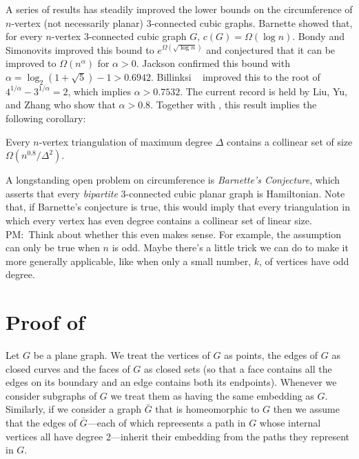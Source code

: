 \documentclass{patmorin}
\newcommand{\note}[2]{{\color{red}#1:~#2}}
\begin{document}
A series of results has steadily improved the lower bounds on the
circumference of $n$-vertex  (not necessarily planar) 3-connected cubic
graphs.  Barnette \cite{barnette:4} showed that, for every $n$-vertex
3-connected cubic graph $G$, $c(G)=\Omega(\log n)$.  Bondy and Simonovits
\cite{bondy.simonovits:7} improved this bound to $e^{\Omega(\sqrt{\log
n})}$ and conjectured that it can be improved to $\Omega(n^\alpha)$ for $\alpha>0$.
Jackson \cite{jackson:8} confirmed this bound with $\alpha=\log_2(1+\sqrt{5})-1
> 0.6942$.  Billinksi \etal\ \cite{billinksi.jacdson.ea:6} improved this
to the root of $4^{1/\alpha}-3^{1/\alpha}=2$, which implies $\alpha>0.7532$.  The current
record is held by Liu, Yu, and Zhang \cite{liu.yu.zhang:circumference}
who show that $\alpha>0.8$.  Together with , this result implies
the following corollary:

\begin{cor}
  Every $n$-vertex triangulation of maximum degree $\Delta$ contains a
  collinear set of size $\Omega(n^{0.8}/\Delta^2)$.
\end{cor}


A longstanding open problem on circumference is \emph{Barnette's
Conjecture}, which asserts that every \emph{bipartite} 3-connected cubic
planar graph is Hamiltonian. Note that, if Barnette's conjecture is true,
this would imply that every triangulation in which every vertex has even
degree contains a collinear set of linear size.  \note{PM}{Think about
whether this even makes sense. For example, the assumption can only be
true when $n$ is odd.  Maybe there's a little trick we can do to make
it more generally applicable, like when only a small number, $k$, of
vertices have odd degree.}



\section{Proof of }

Let $G$ be a plane graph.  We treat the vertices of $G$ as points,
the edges of $G$ as closed curves and the faces of $G$ as closed sets
(so that a face contains all the edges on its boundary and an edge
contains both its endpoints).  Whenever we consider subgraphs of $G$
we treat them as having the same embedding as $G$.  Similarly, if we
consider a graph $\bar{G}$ that is homeomorphic to $G$ then we assume
that the edges of $\bar{G}$---each of which repreesents a path in $G$
whose internal vertices all have degree 2---inherit their embedding from
the paths they represent in $G$.
\end{document}
